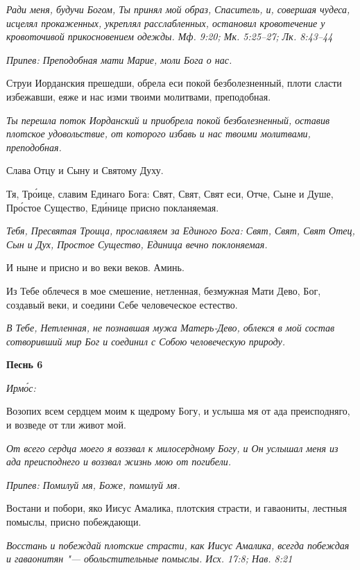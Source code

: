 \itshape Ради меня, будучи Богом, Ты принял мой образ, Спаситель, и, совершая чудеса, исцелял прокаженных, укреплял расслабленных, остановил кровотечение у кровоточивой прикосновением одежды. Мф. 9:20; Мк. 5:25–27; Лк. 8:43–44\normalfont{}


\itshape Припев:\normalfont{} Преподобная мати Марие, моли Бога о нас.


Струи Иорданския прешедши, обрела еси покой безболезненный, плоти сласти избежавши, еяже и нас изми твоими молитвами, преподобная.


\itshape Ты перешла поток Иорданский и приобрела покой безболезненный, оставив плотское удовольствие, от которого избавь и нас твоими молитвами, преподобная.\normalfont{}


Слава Отцу и Сыну и Святому Духу.


Тя, Тро́ице, славим Единаго Бога: Свят, Свят, Свят еси, Отче, Сыне и Душе, Про́стое Существо, Еди́нице присно покланяемая.


\itshape Тебя, Пресвятая Троица, прославляем за Единого Бога: Свят, Свят, Свят Отец, Сын и Дух, Простое Существо, Единица вечно поклоняемая.\normalfont{}


И ныне и присно и во веки веков. Аминь.


Из Тебе облечеся в мое смешение, нетленная, безмужная Мати Дево, Бог, создавый веки, и соедини Себе человеческое естество.


\itshape В Тебе, Нетленная, не познавшая мужа Матерь-Дево, облекся в мой состав сотворивший мир Бог и соединил с Собою человеческую природу.\normalfont{}





\bfseries Песнь 6\normalfont{}


\itshape Ирмо́с:\normalfont{}


Возопих всем сердцем моим к щедрому Богу, и услыша мя от ада преисподняго, и возведе от тли живот мой.


\itshape От всего сердца моего я воззвал к милосердному Богу, и Он услышал меня из ада преисподнего и воззвал жизнь мою от погибели.\normalfont{}


\itshape Припев:\normalfont{} Помилуй мя, Боже, помилуй мя.


Востани и побори, яко Иисус Амалика, плотския страсти, и гаваониты, лестныя помыслы, присно побеждающи.


\itshape Восстань и побеждай плотские страсти, как Иисус Амалика, всегда побеждая и гаваонитян "--- обольстительные помыслы. Исх. 17:8; Нав. 8:21\normalfont{}


